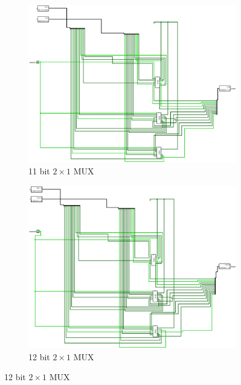 \documentclass[12pt]{article}
\begin{document}
\begin{figure}[H]
    \centering
    \begin{subfigure}[b]{0.3\textwidth}
        \includegraphics[width=\textwidth]{MUX_11_bit.jpg}
        \caption{11 bit $2\times1$ MUX}
        \label{fig:11b2x1mux}
    \end{subfigure}
    \begin{subfigure}[b]{0.3\textwidth}
        \includegraphics[width=\textwidth]{MUX_12_bit.jpg}
        \caption{12 bit $2\times1$ MUX}
        \label{fig:12b2x1mux}
    \end{subfigure}
     \newline
     \newline

\end{figure}
\end{document}
